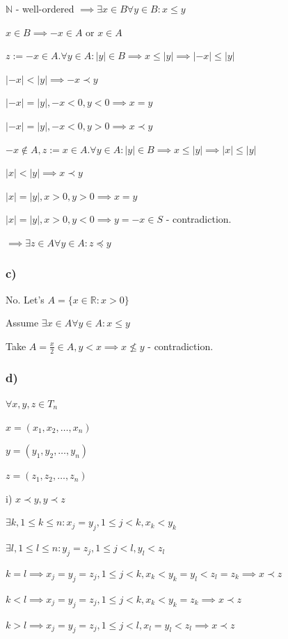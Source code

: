 \documentclass{article}
\begin{document}
$\mathbb{N}$ - well-ordered $\implies \exists x \in B \forall y \in B: x \leq y$

$x \in B \implies -x \in A$ or $x \in A$

\item $z := -x \in A. \forall y \in A: |y| \in B \implies x \leq |y| \implies |-x| \leq |y|$
\item $|-x| < |y| \implies -x \prec y$
\item $|-x|=|y|, -x < 0, y < 0 \implies x = y$
\item $|-x|=|y|, -x < 0, y > 0 \implies x \prec y$
\item $-x \notin A, z := x \in A. \forall y \in A: |y| \in B \implies x \leq |y| \implies |x| \leq |y|$
\item $|x| < |y| \implies x \prec y$
\item $|x|=|y|, x > 0, y > 0 \implies x = y$
\item $|x|=|y|, x > 0, y < 0 \implies y=-x \in S$ - contradiction.

$\implies \exists z \in A \forall y \in A: z \preceq y$

\subsubsection*{c)}

No. Let's $A = \{ x \in \mathbb{R}: x > 0 \}$

Assume $\exists x \in A \forall y \in A: x \leq y$

Take $A = \frac{x}{2} \in A, y < x \implies x \not\leq y$ - contradiction.

\subsubsection*{d)}

$\forall x, y, z \in T_n$

$x = (x_1,x_2,\ldots,x_n)$

$y = (y_1,y_2,\ldots,y_n)$

$z = (z_1,z_2,\ldots,z_n)$

i) $x \prec y, y \prec z$

$\exists k, 1 \leq k \leq n: x_j = y_j, 1 \leq j < k, x_k < y_k$

$\exists l, 1 \leq l \leq n: y_j = z_j, 1 \leq j < l, y_l < z_l$

\item $k = l \implies x_j = y_j = z_j, 1 \leq j < k, x_k < y_k = y_l < z_l = z_k \implies x \prec z$
\item $k < l \implies x_j=y_j=z_j, 1 \leq j < k, x_k < y_k = z_k \implies x \prec z$
\item $k > l \implies x_j = y_j = z_j, 1 \leq j < l, x_l=y_l < z_l \implies x \prec z$
\end{document}
